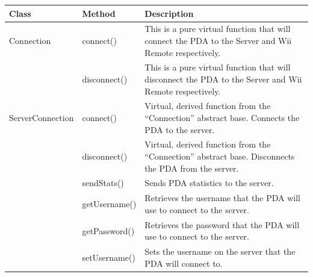 \documentclass{article}
\begin{document}
\begin{longtable}[t]{|p{1.5in}|p{2in}|p{2.5in}|}

\hline
\textbf{Class} & \textbf{Method} & \textbf{Description} \\
\hline %

Connection

	& connect() & This is a pure virtual function that will connect the PDA to the Server and Wii Remote respectively.  \\
	
	\cline{2-3}
	
	& disconnect() & This is a pure virtual function that will disconnect the PDA to the Server and Wii Remote respectively.  \\

	\cline{2-3}

\hline %

ServerConnection
      & connect() & Virtual, derived function from the ``Connection'' abstract base. Connects the PDA to the server.  \\
      
      \cline{2-3}
      
      & disconnect() & Virtual, derived function from the ``Connection'' abstract base. Disconnects the PDA from the server.  \\
      
      \cline{2-3}
      
      & sendStats() & Sends PDA statistics to the server.  \\
      
      \cline{2-3}
      
      & getUsername() & Retrieves the username that the PDA will use to connect to the server.  \\
      
      \cline{2-3}
      
      & getPassword() & Retrieves the password that the PDA will use to connect to the server.  \\
      
      \cline{2-3}
      
      & setUsername() & Sets the username on the server that the PDA will connect to.  \\
      

\end{longtable}
\end{document}
